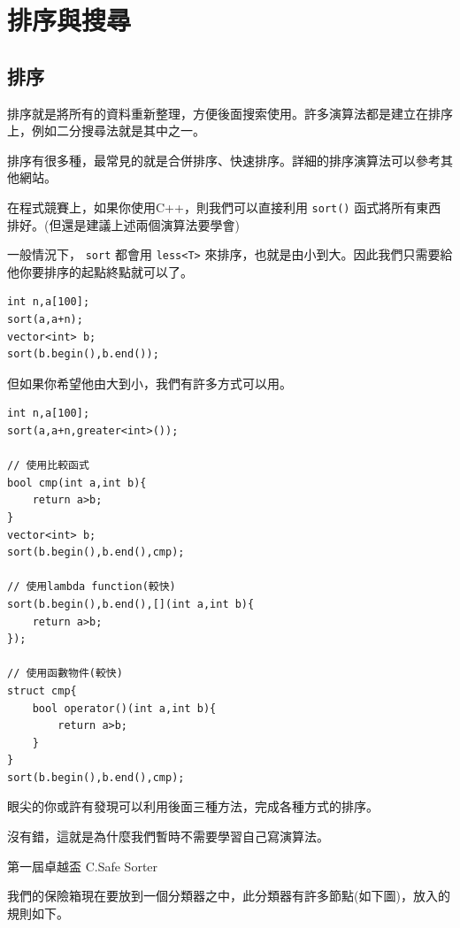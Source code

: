 \section{排序與搜尋}

    \subsection{排序}
    \author{ShangJhe Li}
    排序就是將所有的資料重新整理，方便後面搜索使用。許多演算法都是建立在排序上，例如二分搜尋法就是其中之一。

    排序有很多種，最常見的就是合併排序、快速排序。詳細的排序演算法可以參考其他網站。

    在程式競賽上，如果你使用C++，則我們可以直接利用 \verb|sort()| 函式將所有東西排好。(但還是建議上述兩個演算法要學會)

    一般情況下， \verb|sort| 都會用 \verb|less<T>| 來排序，也就是由小到大。因此我們只需要給他你要排序的起點終點就可以了。

\begin{lstlisting}[caption=一般的sort]
int n,a[100];
sort(a,a+n);
vector<int> b;
sort(b.begin(),b.end());

\end{lstlisting}
        
    但如果你希望他由大到小，我們有許多方式可以用。

\begin{lstlisting}[caption=由大到小排]
int n,a[100];
sort(a,a+n,greater<int>());

// 使用比較函式
bool cmp(int a,int b){
    return a>b;
}
vector<int> b;
sort(b.begin(),b.end(),cmp);

// 使用lambda function(較快)
sort(b.begin(),b.end(),[](int a,int b){
    return a>b;
});

// 使用函數物件(較快)
struct cmp{
    bool operator()(int a,int b){
        return a>b;
    }
}
sort(b.begin(),b.end(),cmp);

\end{lstlisting}

    眼尖的你或許有發現可以利用後面三種方法，完成各種方式的排序。

    沒有錯，這就是為什麼我們暫時不需要學習自己寫演算法。

    \example 第一屆卓越盃 C.Safe Sorter

    我們的保險箱現在要放到一個分類器之中，此分類器有許多節點(如下圖)，放入的規則如下。

